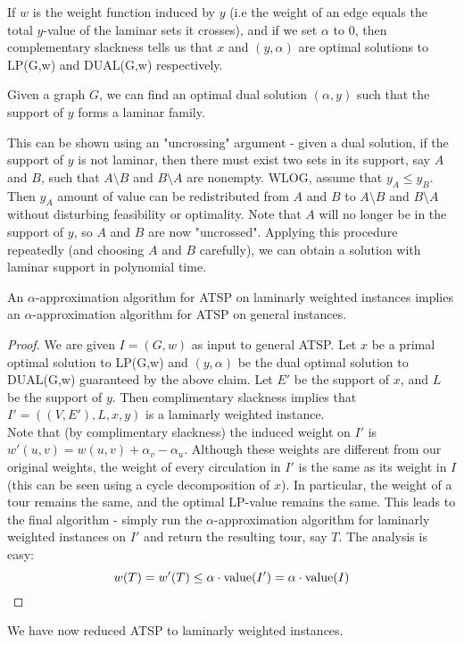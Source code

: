 \documentclass[./main.tex]{subfiles}
\begin{document}
If $w$ is the weight function induced by $y$ (i.e the weight of an edge equals the total $y$-value of the laminar sets it crosses), and if we set $\alpha$ to $0$, then complementary slackness tells us that $x$ and $(y,\alpha)$ are optimal solutions to LP(G,w) and DUAL(G,w) respectively.\\

\begin{claim*}
	Given a graph $G$, we can find an optimal dual solution $(\alpha, y)$ such that the support of $y$ forms a laminar family.
\end{claim*}
	This can be shown using an "uncrossing" argument - given a dual solution, if the support of $y$ is not laminar, then there must exist two sets in its support, say $A$ and $B$, such that $A\setminus B$ and $B\setminus A$ are nonempty. 
	WLOG, assume that $y_A \leq y_B$. Then $y_A$ amount of value can be redistributed from $A$ and $B$ to $A\setminus B$ and $B\setminus A$ without disturbing feasibility or optimality. 
	Note that $A$ will no longer be in the support of $y$, so $A$ and $B$ are now "uncrossed". 
	Applying this procedure repeatedly (and choosing $A$ and $B$ carefully), we can obtain a solution with laminar support in polynomial time.\\
	\begin{theorem} 
		An $\alpha$-approximation algorithm for ATSP on laminarly weighted instances implies an $\alpha$-approximation algorithm for ATSP on general instances.
	\end{theorem}
	\begin{proof} 
		We are given $I=(G,w)$ as input to general ATSP. Let $x$ be a primal optimal solution to LP(G,w) and $(y,\alpha)$ be the dual optimal solution to DUAL(G,w) guaranteed by the above claim. 
		Let $E'$ be the support of $x$, and $L$ be the support of $y$. Then complimentary slackness implies that $I'=((V,E'), L, x, y)$ is a laminarly weighted instance.\\
		Note that (by complimentary slackness) the induced weight on $I'$ is $w'(u,v) = w(u,v) + \alpha_v - \alpha_u$. Although these weights are different from our original weights, the weight of every circulation in $I'$ is the same as its weight in $I$ (this can be seen using a cycle decomposition of $x$). In particular, the weight of a tour remains the same, and the optimal LP-value remains the same. 
		This leads to the final algorithm - simply run the $\alpha$-approximation algorithm for laminarly weighted instances on $I'$ and return the resulting tour, say $T$. 
		The analysis is easy: 
		\[
			w(T) = w'(T)\leq \alpha\cdot \textup{value}(I') = \alpha\cdot\textup{value}(I)
		\]
	\end{proof}
		We have now reduced ATSP to laminarly weighted instances.\vspace{2mm}
\end{document}
